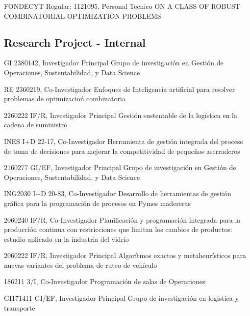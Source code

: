 {FONDECYT Regular: 1121095, Personal Tecnico}
{ON A CLASS OF ROBUST COMBINATORIAL OPTIMIZATION PROBLEMS}

\subsection{Research Project - Internal}

{GI 2380142, Investigador Principal}
{Grupo de investigaci\'on en Gesti\'on de Operaciones, Sustentabilidad, y Data Science}

{RE 2360219, Co-Investigador}
{Enfoques de Inteligencia artificial para resolver problemas de optimizacio\'n combinatoria}

{2260222 IF/R, Investigador Principal}
{Gesti\'on sustentable de la log\'istica en la cadena de suministro}

{INES I+D 22-17, Co-Investigador}
{Herramienta de gesti\'on integrada del proceso de toma de decisiones para mejorar la competitividad de peque\~nos aserraderos}

{2160277 GI/EF, Investigador Principal}
{Grupo de investigaci\'on en Gesti\'on de Operaciones, Sustentabilidad, y Data Science}

{ING2030 I+D 20-83, Co-Investigador}
{Desarrollo de herramientas de gesti\'on gr\'afica para la programaci\'on de procesos en Pymes madereras}

{2060240 IF/R, Co-Investigador}
{Planificaci\'on y programaci\'on integrada para la producci\'on continua con restricciones que limitan los cambios de productos: estudio aplicado en la industria del vidrio}

{2060222 IF/R, Investigador Principal}
{Algor\'itmos exactos y metaheur\'isticos para nuevas variantes del problema de ruteo de veh\'iculo}

{186211 3/I, Co-Investigador}
{Programaci\'on de salas de Operaciones}

{GI171411 GI/EF, Investigador Principal}
{Grupo de investigaci\'on en logistica y transporte}

\clearpage